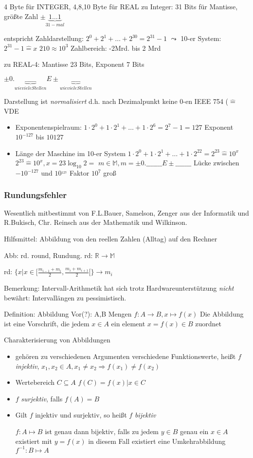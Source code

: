 4 Byte für INTEGER, 4,8,10 Byte für REAL
zu Integer: 31 Bits für Mantisse, größte Zahl $\pm \underbrace{1\ldots1}_{31-mal}$

entspricht Zahldarstellung: $2^0+2^1+\ldots+2^{30}=2^{31}-1$
$\leadsto$ 10-er System: $2^{31}-1 \hat{=} x$ $2{10}\approx 10^3$
Zahlbereich: -2Mrd. bis 2 Mrd

zu REAL-4: Mantisse 23 Bits, Exponent 7 Bits

$\pm 0.\underbrace{\_\_\_\_\_}_{wieviele Stellen}E\pm\underbrace{\_\_\_\_}_{wieviele Stellen}$

Darstellung ist \emph{normalisiert} d.h. nach Dezimalpunkt keine 0-en
IEEE 754 ($\hat{=}$ VDE
\begin{itemize}
 \item Exponentenspielraum: $1\cdot 2^0+1\cdot2^1+\ldots+1\cdot2^6 = 2^7 -1 = 127$
  Exponent $10^{-127}$ bis $10{127}$
 \item Länge der Maschine im 10-er System
$1\cdot 2^0+1\cdot2^1+\ldots+1\cdot2^22=2^{23} \hat{=} 10^x$
$2^{23}\hat{=}10^x, x=23 \log_10 2 = $
$m \in \mathbb{M}, m=\pm 0.\_\_\_\_\_\_\_E\pm \_\_\_\_\_\_\_$ Lücke zwischen $-10^{-127}$ und $10^{_127}$ Faktor $10^7$ groß
\end{itemize}

\subsubsection{Rundungsfehler}

Wesentlich mitbestimmt von F.L.Bauer, Samelson, Zenger aus der Informatik und R.Bukisch, Chr. Reinsch aus der Mathematik und Wilkinson.

Hilfsmittel: Abbildung von den reellen Zahlen (Alltag) auf den Rechner

Abb: rd. round, Rundung. rd: $\mathbb{R}\rightarrow\mathbb{M}$

rd: $\{x|x \in [\frac{m_{i-1}+m_i}{2},\frac{m_{i}+m_{i+1}}{2}[\} \rightarrow m_i$

Bemerkung: Intervall-Arithmetik hat sich trotz Hardwareunterstützung \emph{nicht} bewährt: Intervallängen zu pessimistisch.

Definition: Abbildung
Vor(?): A,B Mengen
$f: A \rightarrow B, x \mapsto f(x)$
Die Abbildung ist eine Vorschrift, die jedem $x \in A$ ein element $x=f(x) \in B$ zuordnet

Charakterisierung von Abbildungen
\begin{itemize}
 \item gehören zu verschiedenen Argumenten verschiedene Funktionswerte, heißt $f$ \emph{injektiv},
$x_1,x_2 \in A, x_1 \neq x_2 \Rightarrow f(x_1) \neq f(x_2)$
 \item Wertebereich $C \subseteq A$
$f(C) = {f(x)|x\in C}$
 \item $f$ \emph{surjektiv}, falls $f(A)=B$
 \item Gilt $f$ injektiv und surjektiv, so heißt $f$ \emph{bijektiv}

$f: A \mapsto B$ ist genau dann bijektiv, falls zu jedem $y \in B$ genau ein $x \in A $ existiert mit $y=f(x)$ in diesem Fall existiert eine Umkehrabbildung $f^{-1}: B \mapsto A$
\end{itemize}
